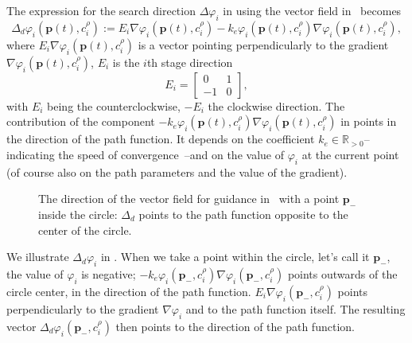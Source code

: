 The expression for the search direction $\Delta\varphi_i$ in  using the vector field in~\citep{de2017guidance} becomes
\begin{equation}\label{eq:pd}
  \Delta_d\varphi_i(\mathbf{p}(t),c_i^\rho):=E_i\nabla\varphi_i(\mathbf{p}(t),c_i^\rho)-k_e\varphi_i(\mathbf{p}(t),c_i^\rho)\nabla\varphi_i(\mathbf{p}(t),c_i^\rho),
\end{equation}
where $E_i\nabla\varphi_i(\mathbf{p}(t),c_i^\rho)$ is a vector pointing perpendicularly to the gradient $\nabla\varphi_i(\mathbf{p}(t),c_i^\rho)$, $E_i$ is the $i$th stage direction
\begin{equation}
  E_i=\begin{bmatrix}
    0&1\\-1&0
  \end{bmatrix},
\end{equation}
with $E_i$ being the counterclockwise, $-E_i$ the clockwise direction. 
The contribution of the component $-k_e\varphi_i(\mathbf{p}(t),c_i^\rho)\nabla\varphi_i(\mathbf{p}(t),c_i^\rho)$ in  points in the direction of the path function. It depends on the coefficient $k_e\in\mathbb{R}_{>0}$--indicating the speed of convergence~\citep{de2017guidance}--and on the value of $\varphi_i$ at the current point (of course also on the path parameters and the value of the gradient). 
\begin{figure}[h!]
  \centering
  \selectfont
  
  \caption[Direction of the vector field inside the path function]{The direction of the vector field for guidance in~\citep{de2017guidance} with a point $\mathbf{p}_{-}$ inside the circle: $\Delta_d$ points to the path function opposite to the center of the circle.}
  \label{fig:grad_gvf1}
\end{figure}
We illustrate $\Delta_d\varphi_i$ in . When we take a point within the circle, let's call it $\mathbf{p}_{-}$, the value of $\varphi_i$ is negative; $-k_e\varphi_i(\mathbf{p}_{-},c_i^\rho)\nabla\varphi_i(\mathbf{p}_{-},c_i^\rho)$ points outwards of the circle center, in the direction of the path function. $E_i\nabla\varphi_i(\mathbf{p}_{-},c_i^\rho)$ points perpendicularly to the gradient $\nabla\varphi_i$ and to the path function itself. The resulting vector $\Delta_d\varphi_i(\mathbf{p}_{-},c_i^\rho)$ then points to the direction of the path function.

